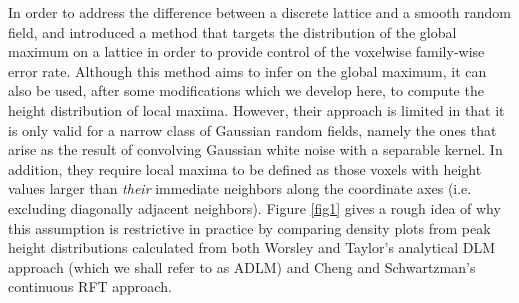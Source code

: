 \documentclass{article}
\newcommand{\nt}[1]{\textit{\color{red} #1}}
\begin{document}
In order to address the difference between a discrete lattice and a smooth random field, \cite{worsley2005improved} and \cite{taylor2007maxima} introduced a method that targets the distribution of the global maximum on a lattice in order to provide control of the voxelwise family-wise error rate. Although this method aims to infer on the global maximum, it can also be used, after some modifications which we develop here, to compute the height distribution of local maxima. However, their approach is limited in that it is only valid for a narrow class of Gaussian random fields, namely the ones that arise as the result of convolving Gaussian white noise with a separable kernel. In addition, they require local maxima to be defined as those voxels with height values larger than \nt{their} immediate neighbors along the coordinate axes (i.e. excluding diagonally adjacent neighbors). Figure \ref{fig1} gives a rough idea of why this assumption is restrictive in practice by comparing density plots from peak height distributions calculated from both Worsley and Taylor's analytical DLM approach (which we shall refer to as ADLM) and Cheng and Schwartzman's continuous RFT approach. 
\end{document}
